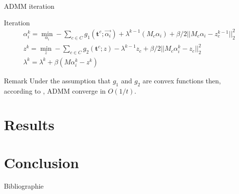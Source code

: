 \documentclass{beamer}
\begin{document}
\begin{frame}{ADMM iteration}
    \begin{block}{Iteration}
    \begin{equation}
        \begin{split}
            &\alpha_i^k = \min_{\alpha_i} -\sum_{c\in C} g_1(\textbf{t}^c;\Vec{\alpha_i}) + \lambda^{k-1}(M_c \alpha_i) + \beta/2 ||M_c\alpha_i - z_c^{k-1}||^2_2\\
            &z^k = \min_z -\sum_{c\in C} g_2(\textbf{t}^c;z) - \lambda^{k-1} z_c + \beta/2 ||M_c \alpha_i^k -z_c||_2^2\\
            &\lambda^k = \lambda^k + \beta(M\alpha_i^k - z^k)
        \end{split}
    \end{equation}
   \end{block}
    \begin{block}{Remark}
    Under the assumption that $g_1$ and $g_2$ are convex functions then, according to \cite{ADMM_Convergence}, ADMM converge in $O(1/t)$.
    \end{block}
\end{frame}
\section{Results}

\section{Conclusion}
\begin{frame}{Bibliographie}
    
    
\end{frame}
\end{document}
